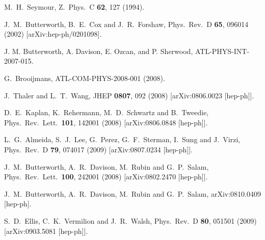 \documentclass{JHEP3}
\begin{document}
\begin{thebibliography}{99}

 M.~H.~Seymour,
 Z.\ Phys.\  C {\bf 62}, 127 (1994).

 J.~M.~Butterworth, B.~E.~Cox and J.~R.~Forshaw,
 Phys.\ Rev.\  D {\bf 65}, 096014 (2002)
 [arXiv:hep-ph/0201098].

J. M. Butterworth, A. Davison, E. Ozcan, and P. Sherwood,
ATL-PHYS-INT-2007-015.

  G.~Brooijmans, ATL-COM-PHYS-2008-001 (2008).

 J.~Thaler and L.~T.~Wang,
 JHEP {\bf 0807}, 092 (2008)
 [arXiv:0806.0023 [hep-ph]].

 D.~E.~Kaplan, K.~Rehermann, M.~D.~Schwartz and B.~Tweedie,
 Phys.\ Rev.\ Lett.\  {\bf 101}, 142001 (2008)
 [arXiv:0806.0848 [hep-ph]].

 L.~G.~Almeida, S.~J.~Lee, G.~Perez, G.~F.~Sterman, I.~Sung and J.~Virzi,
 Phys.\ Rev.\  D {\bf 79}, 074017 (2009)
 [arXiv:0807.0234 [hep-ph]].



 J.~M.~Butterworth, A.~R.~Davison, M.~Rubin and G.~P.~Salam,
 Phys.\ Rev.\ Lett.\  {\bf 100}, 242001 (2008)
 [arXiv:0802.2470 [hep-ph]].

 J.~M.~Butterworth, A.~R.~Davison, M.~Rubin and G.~P.~Salam,
 arXiv:0810.0409 [hep-ph].

 S.~D.~Ellis, C.~K.~Vermilion and J.~R.~Walsh,
 Phys.\ Rev.\  D {\bf 80}, 051501 (2009)
 [arXiv:0903.5081 [hep-ph]].


\end{thebibliography}
\end{document}
